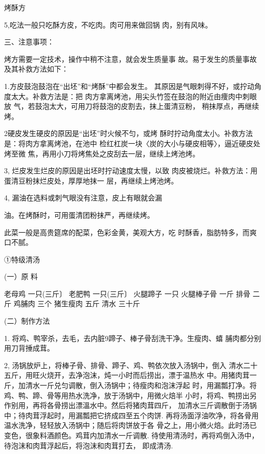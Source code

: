 \begin{recipe}{烤酥方}
\notes

5,吃法一般只吃酥方皮，不吃肉。肉可用来做回锅 肉，别有风味。

三、注意事项：

烤方需要一定技术，操作中稍不注意，就会发生质量事 故。易于发生的质量事故及其补救方法如下：

1.方皮鼓泡鼓泡在“出坯”和“烤酥”中都会发生。 其原因是气眼刺得不好，或拧动角度太大。补救方法是：把 肉方拿离烤池，用尖头竹签在鼓泡的附近由痩肉中刺眼放 气，若鼓泡太大，可用刀将鼓泡的皮割去，抹上蛋清豆粉， 稍抹厚点，再继续烤。

2硬皮发生硬皮的原因是“出坯”时火候不匀，或烤 酥时拧动角度太小。补救方法是：将肉方拿离烤池，在池中 检红杠炭一块〈炭的大小与硬皮相等〉，逼近硬皮处烤至微 焦，再用小刀将烤焦处之皮刮去一层，继续上烤池烤。

3,	烂皮发生烂皮的原因是出坯时拧动速度太慢，以致 肉皮被烧烂。补救方法：用蛋清豆粉抹烂皮处，厚厚地抹一 层，再继续上烤池烤。

4,	漏油在选料或刺气眼没有注意，皮上有眼就会漏

油。在烤酥时，可用蛋清团粉抹严，再继续烤。

\notes

此菜一般是高贵筵席的配菜，色彩金黄，美观大方，吃 时酥香，脂肪特多，而爽口不腻。

①特级清汤

(一）原 料

老母鸡	一只(三斤〕	老肥鸭	一只(三斤〕
火腿蹄子	一只	火腿棒子骨	一斤
排骨	二斤	鸡脯肉	三个
猪生瘦肉	五斤	清水	三十斤

(二）制作方法

1.	将鸡、鸭宰杀，去毛，去内脏9蹄子、棒子骨刮洗干净。生瘦肉、蟢 脯肉都分别用刀背捶成茸。

2,	汤锅放炉上，将棒子骨、排骨、蹄子、鸡、鸭依次放入汤锅中，倒入 清水二十五斤，用旺火烧开，去净泡沫，炖一小时而后捞出，漂于温热水 中。用猪肉茸一斤，加清水一斤兑匀调散，倒入汤锅中；待瘦肉和泡沫浮起 时，用漏瓢打净。将鸡、鸭、蹄、骨等用热水洗净，放于汤锅中，用微火焙半 小时，将鸡、鸭捞出另作别用，再将各骨捞出漂溫水中。然后将猪肉茸四斤， 加清水三斤调散倒于汤锅中；待肉茸浮起时，用漏瓢把它挤成四至五个肉饼. 再将汤面浮油吹净，将各骨用温水洗净，轻轻放入汤锅中；随后将肉饼放于各 骨之上，用小微火焙。此时汤已变色，很象料酒颜色。鸡茸内加清水一斤调散. 待使用清汤时，再将鸡倒入汤中，待泡沫和肉茸浮起后，将泡沫和肉茸打去， 即成清汤.

\end{recipe}

